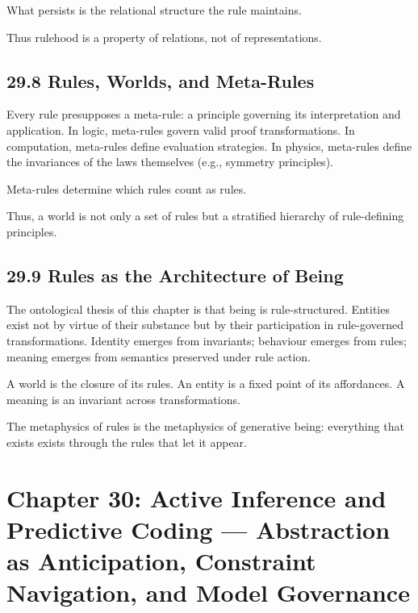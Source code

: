 \documentclass[12pt,letterpaper]{article}
\theoremstyle{remark}
\begin{document}
What persists is the relational structure the rule maintains.

Thus rulehood is a property of relations, not of representations.

\subsection{29.8 Rules, Worlds, and Meta-Rules}

Every rule presupposes a meta-rule: a principle governing its interpretation and application. In logic, meta-rules govern valid proof transformations. In computation, meta-rules define evaluation strategies. In physics, meta-rules define the invariances of the laws themselves (e.g., symmetry principles).

Meta-rules determine which rules count as rules.

Thus, a world is not only a set of rules but a stratified hierarchy of rule-defining principles.

\subsection{29.9 Rules as the Architecture of Being}

The ontological thesis of this chapter is that being is rule-structured. Entities exist not by virtue of their substance but by their participation in rule-governed transformations. Identity emerges from invariants; behaviour emerges from rules; meaning emerges from semantics preserved under rule action.

A world is the closure of its rules.  
An entity is a fixed point of its affordances.  
A meaning is an invariant across transformations.

The metaphysics of rules is the metaphysics of generative being: everything that exists exists through the rules that let it appear.

\newpage
\section{Chapter 30: Active Inference and Predictive Coding —  
Abstraction as Anticipation, Constraint Navigation, and Model Governance}
\end{document}
